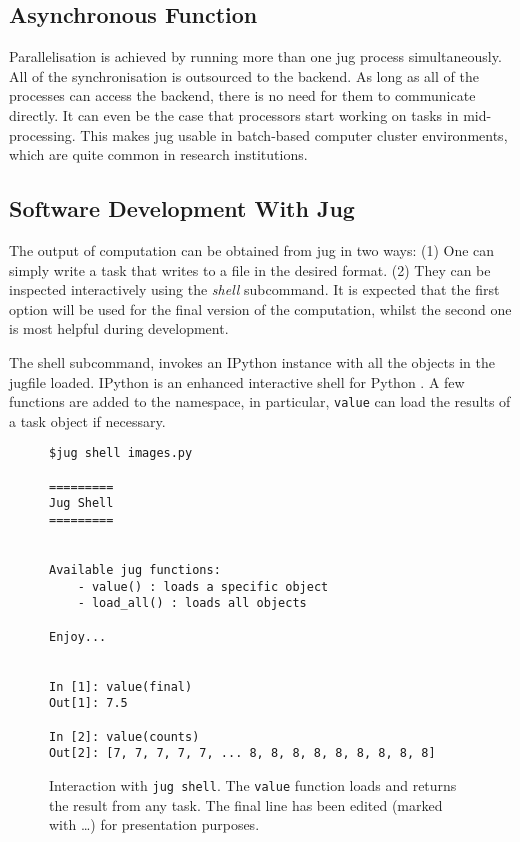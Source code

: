 \documentclass{article}
\let\code\texttt
\begin{document}
\subsection{Asynchronous Function}

Parallelisation is achieved by running more than one jug process
simultaneously. All of the synchronisation is outsourced to the backend. As
long as all of the processes can access the backend, there is no need for them
to communicate directly. It can even be the case that processors start working
on tasks in mid-processing. This makes jug usable in batch-based computer
cluster environments, which are quite common in research institutions.

\subsection{Software Development With Jug}

The output of computation can be obtained from jug in two ways: (1) One can
simply write a task that writes to a file in the desired format. (2) They can
be inspected interactively using the \emph{shell} subcommand. It is expected
that the first option will be used for the final version of the computation,
whilst the second one is most helpful during development.

The shell subcommand, invokes an IPython instance with all the objects in the
jugfile loaded. IPython is an enhanced interactive shell for Python
\citep{Perez2007}. A few functions are added to the namespace, in particular,
\code{value} can load the results of a task object if necessary.

\begin{figure}
\begin{center}
\begin{verbatim}
$jug shell images.py

=========
Jug Shell
=========


Available jug functions:
    - value() : loads a specific object
    - load_all() : loads all objects

Enjoy...


In [1]: value(final)
Out[1]: 7.5

In [2]: value(counts)
Out[2]: [7, 7, 7, 7, 7, ... 8, 8, 8, 8, 8, 8, 8, 8, 8]
\end{verbatim}
\end{center}
\caption{Interaction with \code{jug shell}. The \code{value} function loads and
returns the result from any task. The final line has been edited (marked with
\ldots) for presentation purposes.}
\label{fig:jug-shell-interaction}
\end{figure}
\end{document}
